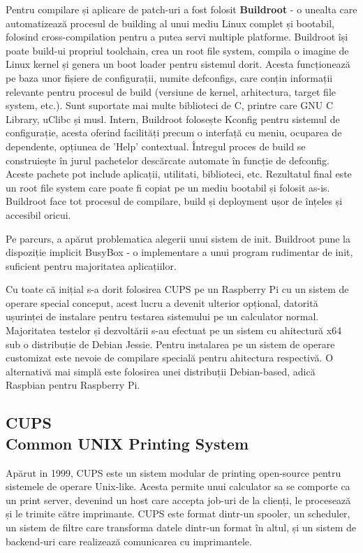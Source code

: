 \documentclass[a4paper, 12pt, twoside]{report}
\begin{document}
Pentru compilare și aplicare de patch-uri a fost folosit {\textbf{Buildroot}} - o unealta care automatizează procesul de building al unui mediu Linux complet și bootabil, folosind cross-compilation pentru a putea servi multiple platforme. Buildroot își poate build-ui propriul toolchain, crea un root file system, compila o imagine de Linux kernel și genera un boot loader pentru sistemul dorit. Acesta funcționează pe baza unor fișiere de configurații, numite defconfigs, care conțin informații relevante pentru procesul de build (versiune de kernel, arhitectura, target file system, etc.). Sunt suportate mai multe biblioteci de C, printre care GNU C Library, uClibc și musl. Intern, Buildroot folosește Kconfig pentru sistemul de configurație, acesta oferind facilități precum o interfață cu meniu, ocuparea de dependente, opțiunea de 'Help' contextual. Întregul proces de build se construiește în jurul pachetelor descărcate automate în funcție de defconfig. Aceste pachete pot include aplicații, utilitati, biblioteci, etc. Rezultatul final este un root file system care poate fi copiat pe un mediu bootabil și folosit as-is. Buildroot face tot procesul de compilare, build și deployment ușor de înțeles și accesibil oricui.

Pe parcurs, a apărut problematica alegerii unui sistem de init. Buildroot pune la dispoziție implicit BusyBox - o implementare a unui program rudimentar de init, suficient pentru majoritatea aplicațiilor.

Cu toate că inițial s-a dorit folosirea CUPS pe un Raspberry Pi cu un sistem de operare special conceput, acest lucru a devenit ulterior opțional, datorită ușurinței de instalare pentru testarea sistemului pe un calculator normal. Majoritatea testelor și dezvoltării s-au efectuat  pe un sistem cu ahitectură x64 sub o distribuție de Debian Jessie. Pentru instalarea pe un sistem de operare customizat este nevoie de compilare specială pentru ahitectura respectivă. O alternativă mai simplă este folosirea unei distribuții Debian-based, adică Raspbian pentru Raspberry Pi.

		\subsection[CUPS]{CUPS\\ {\normalsize Common UNIX Printing System}}
Apărut in 1999, CUPS este un sistem modular de printing open-source pentru sistemele de operare Unix-like. Acesta permite unui calculator sa se comporte ca un print server, devenind un host care accepta job-uri de la clienți, le procesează și le trimite către imprimante.
CUPS este format dintr-un spooler, un scheduler, un sistem de filtre care transforma datele dintr-un format în altul, și un sistem de backend-uri care realizează comunicarea cu imprimantele.
\end{document}
